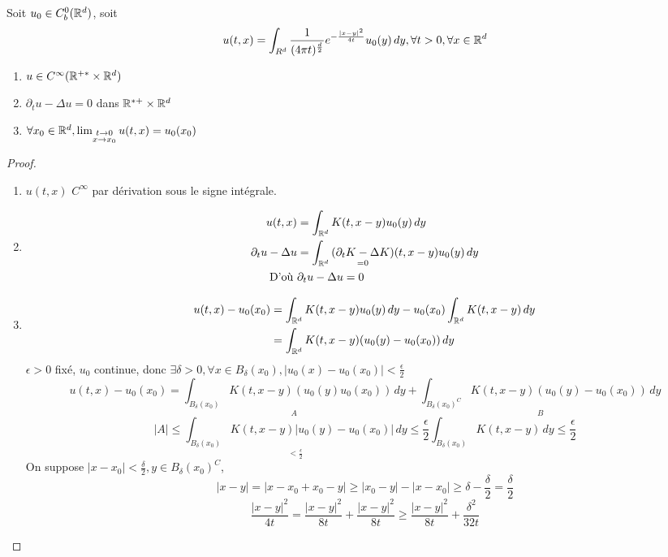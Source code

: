 \documentclass[]{report}
\begin{document}
    \begin{tm}{}{}
        Soit $u_0\in C_b^0(\mathbb{R}^d)$, soit 
        \[u(t,x)=\int_{R^d}\frac{1}{(4\pi t)^{\frac{d}{2}}}e^{-\frac{|x-y|^2}{4t}}u_0(y)\, dy,\forall t>0,\forall x\in \mathbb{R}^d\]
        \begin{enumerate}
            \item $u\in C^\infty(\mathbb{R}^{+*}\times \mathbb{R}^d)$
            \item $\partial_t u-\Delta u=0$ dans $\mathbb{R}^{*+}\times \mathbb{R}^d$
            \item $\forall x_0\in \mathbb{R}^d,\lim_{\substack{t\to 0\\ x\to x_0}}u(t,x)=u_0(x_0)$
        \end{enumerate}
    \end{tm}

    \begin{proof}
        \begin{enumerate}
            \item $u(t,x)$ $C^\infty$ par dérivation sous le signe intégrale.
            \item \begin{align*}
                u(t,x)&=\int_{\mathbb{R}^d}K(t,x-y)u_0(y)\, dy\\
                \partial_t u-\Delta u&=\int_{\mathbb{R}^d}\underset{=0}{(\partial_t K-\Delta K)}(t,x-y)u_0(y)\, dy\\
                \text{D'où }&\partial_t u-\Delta u=0
            \end{align*}
            \item \begin{align*}
                u(t,x)-u_0(x_0)&=\int_{\mathbb{R}^d}K(t,x-y)u_0(y)\, dy-u_0(x_0)\int_{\mathbb{R}^d}K(t,x-y)\, dy\\
                &=\int_{\mathbb{R}^d}K(t,x-y)(u_0(y)-u_0(x_0))\, dy
            \end{align*}
            $\epsilon>0$ fixé, $u_0$ continue, donc $\exists \delta>0,\forall x\in B_\delta(x_0),|u_0(x)-u_0(x_0)|<\frac{\epsilon}{2}$
            \[u(t,x)-u_0(x_0)=\underset{A}{\int_{B_\delta(x_0)}K(t,x-y)(u_0(y)u_0(x_0))\, dy}+\underset{B}{\int_{B_{\delta}(x_0)^C}K(t,x-y)(u_0(y)-u_0(x_0))\, dy}\]
            \[|A|\le \underset{<\frac{\epsilon}{2}}{\int_{B_\delta(x_0)}K(t,x-y)|u_0(y)-u_0(x_0)|\, dy}\le \frac{\epsilon}{2} \int_{B_\delta(x_0)}K(t,x-y)\, dy\le \frac{\epsilon}{2}\]
            On suppose $|x-x_0|<\frac{\delta}{2},y\in B_\delta(x_0)^C$,
            \[|x-y|=|x-x_0+x_0-y|\ge |x_0-y|-|x-x_0|\ge \delta-\frac{\delta}{2}=\frac{\delta}{2}\]
            \[\frac{|x-y|^2}{4t}=\frac{|x-y|^2}{8t}+\frac{|x-y|^2}{8t}\ge \frac{|x-y|^2}{8t}+\frac{\delta^2}{32 t}\]

\end{enumerate}
\end{proof}
\end{document}
